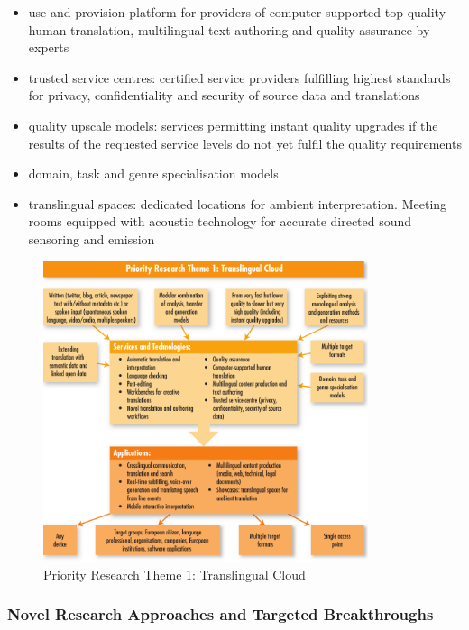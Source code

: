 \documentclass[10pt, plain]{../../metanetpaper}
\begin{document}
\begin{multicols}{2}
\begin{itemize}
\item use and provision platform for providers of computer-supported top-quality human translation, multilingual text authoring and quality assurance by experts
\item trusted service centres: certified service providers fulfilling highest standards for privacy, confidentiality and security of source data and translations
\item quality upscale models: services permitting instant quality upgrades if the results of the requested service levels do not yet fulfil the quality requirements
\item domain, task and genre specialisation models
\item translingual spaces: dedicated locations for ambient interpretation. Meeting rooms equipped with acoustic technology for accurate directed sound sensoring and emission
\end{itemize}

\begin{figure}[htb]
  \center
  \includegraphics[width=0.85\textwidth]{../_media/PT1}
  \caption{Priority Research Theme 1: Translingual Cloud}
  \label{fig:pt1-overview}
\end{figure}

\subsubsection{Novel Research Approaches and Targeted Breakthroughs}
\label{sec:novel-rese-appr-pt1}


\end{multicols}
\end{document}
